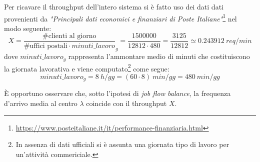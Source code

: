 Per ricavare il throughput dell'intero sistema si è fatto uso dei dati dati provenienti da \textsl{"Principali dati economici e finanziari di Poste Italiane"}\footnote{\url{https://www.posteitaliane.it/it/performance-finanziaria.html}} nel modo seguente:
\begin{equation}
X = \frac{\# \text{clienti al giorno}}{\#\text{uffici postali} \cdot minuti\_lavoro}_{g} = \frac{1500000}{12812\cdot 480} = \frac{3125}{12812} \simeq 0.243912\ req/min
\end{equation} 
dove $minuti\_lavoro_{g}$ rappresenta l'ammontare medio di minuti che costituiscono la giornata lavorativa e viene computato\footnote{In assenza di dati ufficiali si è assunta una giornata tipo di lavoro per un'attività commericiale.} come segue:
\begin{equation}
\label{eqn:modello-specifiche-15}
minuti\_lavoro_{g} = 8\ h/gg = (60 \cdot 8)\ min/gg = 480\ min/gg
\end{equation}

È opportuno osservare che, sotto l'ipotesi di \textsl{job flow balance}, la frequenza d'arrivo media al centro $\lambda$ coincide con il throughput $X$.

